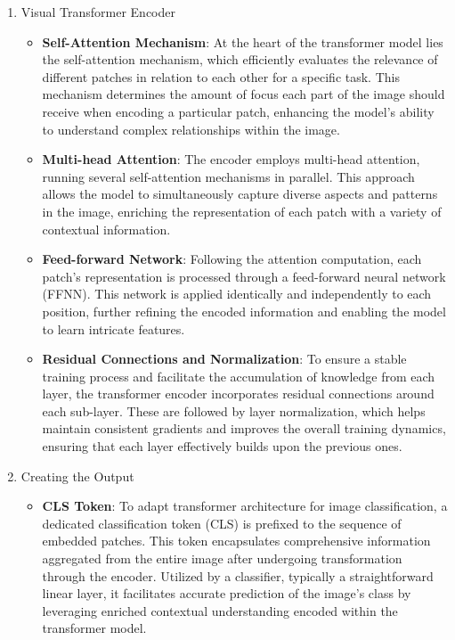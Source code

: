 \documentclass[12pt,a4paper]{report}
\begin{document}
\begin{enumerate}
  \item Visual Transformer Encoder
        \begin{itemize}
          \item \textbf{Self-Attention Mechanism}: At the heart of the transformer model lies the self-attention mechanism, which efficiently evaluates the relevance of different patches in relation to each other for a specific task. This mechanism determines the amount of focus each part of the image should receive when encoding a particular patch, enhancing the model's ability to understand complex relationships within the image.
          \item \textbf{Multi-head Attention}: The encoder employs multi-head attention, running several self-attention mechanisms in parallel. This approach allows the model to simultaneously capture diverse aspects and patterns in the image, enriching the representation of each patch with a variety of contextual information.
          \item \textbf{Feed-forward Network}: Following the attention computation, each patch's representation is processed through a feed-forward neural network (FFNN). This network is applied identically and independently to each position, further refining the encoded information and enabling the model to learn intricate features.
          \item \textbf{Residual Connections and Normalization}: To ensure a stable training process and facilitate the accumulation of knowledge from each layer, the transformer encoder incorporates residual connections around each sub-layer. These are followed by layer normalization, which helps maintain consistent gradients and improves the overall training dynamics, ensuring that each layer effectively builds upon the previous ones.
        \end{itemize}

  \item Creating the Output
        \begin{itemize}
          \item \textbf{CLS Token}: To adapt transformer architecture for image classification, a dedicated classification token (CLS) is prefixed to the sequence of embedded patches. This token encapsulates comprehensive information aggregated from the entire image after undergoing transformation through the encoder. Utilized by a classifier, typically a straightforward linear layer, it facilitates accurate prediction of the image's class by leveraging enriched contextual understanding encoded within the transformer model.
        \end{itemize}


\end{enumerate}
\end{document}
